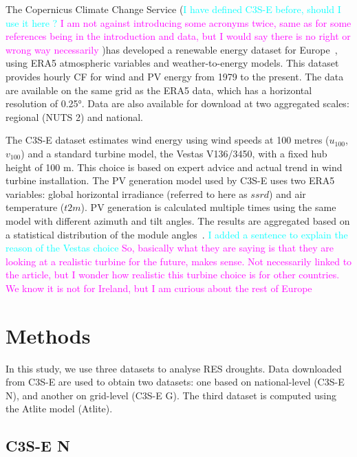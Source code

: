 \documentclass[a4paper, 11pt]{article}
\begin{document}
The Copernicus Climate Change Service (\textcolor{cyan}{I have defined C3S-E before, should I use it here ?} \textcolor{magenta}{I am not against introducing some acronyms twice, same as for some references being in the introduction and data, but I would say there is no right or wrong way necessarily} )has developed a renewable energy dataset for Europe~\cite{dubus2023energy}, using ERA5 atmospheric variables and weather-to-energy models. This dataset provides hourly CF for wind and PV energy from 1979 to the present. The data are available on the same grid as the ERA5 data, which has a horizontal resolution of 0.25°. Data are also available for download at two aggregated scales: regional (NUTS 2) and national.

The C3S-E dataset estimates wind energy using wind speeds at 100 metres ($u_{100}$, $v_{100}$) and a standard turbine model, the Vestas V136/3450, with a fixed hub height of 100 m. This choice is based on expert advice and actual trend in wind turbine installation. The PV generation model used by C3S-E uses two ERA5 variables: global horizontal irradiance (referred to here as $ssrd$) and air temperature ($t2m$). PV generation is calculated multiple times using the same model with different azimuth and tilt angles. The results are aggregated based on a statistical distribution of the module angles~\cite{saintdrenan2018solar}. \textcolor{cyan}{I added a sentence to explain the reason of the Vestas choice} \textcolor{magenta}{So, basically what they are saying is that they are looking at a realistic turbine for the future, makes sense. Not necessarily linked to the article, but I wonder how realistic this turbine choice is for other countries. We know it is not for Ireland, but I am curious about the rest of Europe}

\section{Methods}
\label{sec:methods}

In this study, we use three datasets to analyse RES droughts. Data downloaded from C3S-E are used to obtain two datasets: one based on national-level (C3S-E N), and another on grid-level (C3S-E G). The third dataset is computed using the Atlite model (Atlite).

\subsection{C3S-E N}
\label{sec:C3SEN}
\end{document}
